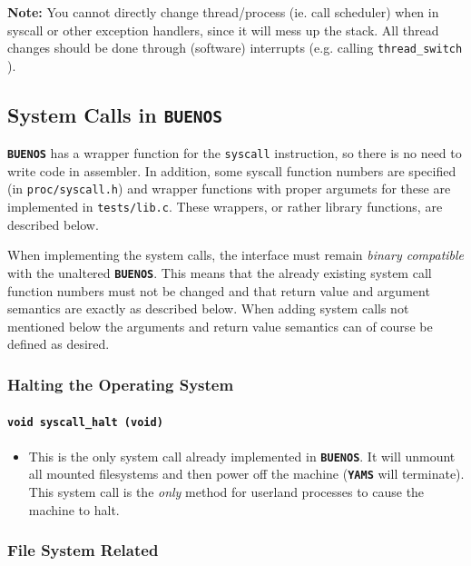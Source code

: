 \documentclass[twoside,a4paper]{report}
\makeatletter
\newenvironment{function}[3]{%
\paragraph{\texttt{#1 {\textbf{#2}} (#3)}}%
\index{#2@\texttt{#2}}%
\begin{itemize}%
}{%
\end{itemize}%
}
\newcommand{\buenos}{\texttt{\textbf{BUENOS}}}
\newcommand{\yams}{\texttt{\textbf{YAMS}}}
\makeatother
\begin{document}
\textbf{Note:} You cannot directly change thread/process (ie. call
scheduler) when in syscall or other exception handlers, since it will
mess up the stack. All thread changes should be done through
(software) interrupts  (e.g. calling
\texttt{thread\_switch}
).

\subsection{System Calls in \buenos{}}
\label{sec:syscalllist}


\buenos{} has a wrapper function for the \texttt{syscall} instruction,
so there is no need to write code in assembler. In addition, some
syscall function numbers are specified (in \texttt{proc/syscall.h})
and wrapper functions with proper argumets for these are implemented
in \texttt{tests/lib.c}. These wrappers, or rather library functions,
are described below.

When implementing the system calls, the interface must remain
\emph{binary compatible} with the unaltered \buenos{}. This means that
the already existing system call function numbers must not be changed
and that return value and argument semantics are exactly as described
below. When adding system calls not mentioned below the arguments and
return value semantics can of course be defined as desired.

\subsubsection{Halting the Operating System}

\begin{function}{void}{syscall\_halt}{void}
\item This is the only system call already implemented in
\buenos{}. It will unmount all mounted filesystems and then power off
the machine (\yams{} will terminate). This system call is the
\emph{only} method for userland processes to cause the machine to
halt.
\end{function}

\subsubsection{File System Related}
\end{document}
